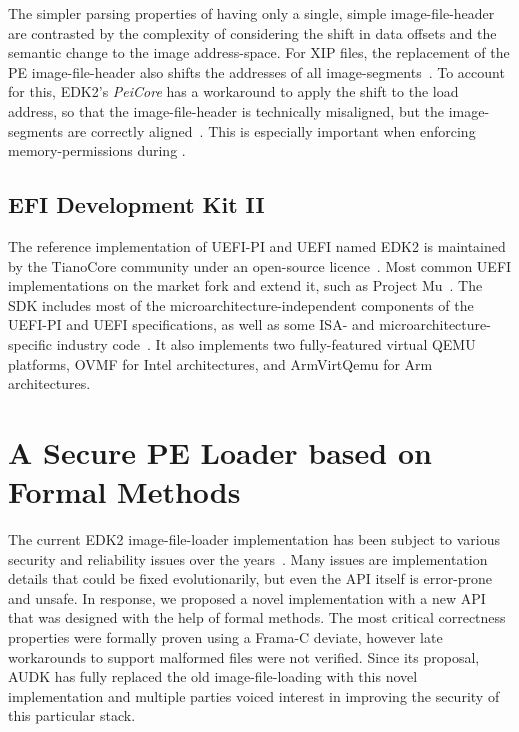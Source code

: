 The simpler parsing properties of having only a single, simple \gls{image-file-header} are contrasted by the complexity of considering the shift in data offsets and the semantic change to the \gls{image} \gls{address-space}. For \gls{XIP} files, the replacement of the \gls{PE} \gls{image-file-header} also shifts the addresses of all \glspl{image-segment}~\cite{secure-pe}. To account for this, \gls{EDK2}'s \textit{PeiCore} has a workaround to apply the shift to the load address, so that the \gls{image-file-header} is technically misaligned, but the \glspl{image-segment} are correctly aligned~\cite{edk2,secure-pe}. This is especially important when enforcing \glspl{memory-permission} during .

\subsection{EFI Development Kit II}

The reference implementation of \gls{UEFI-PI} and \gls{UEFI} named \gls{EDK2} is maintained by the TianoCore community under an open-source licence~\cite{edk2}. Most common \gls{UEFI} implementations on the market fork and extend it, such as  Project Mu~\cite{mu-basecore}. The \gls{SDK} includes most of the microarchitecture-independent components of the \gls{UEFI-PI} and \gls{UEFI} specifications, as well as some \gls{ISA}- and microarchitecture-specific industry code~\cite{edk2}. It also implements two fully-featured virtual QEMU~\cite{qemu} platforms, \gls{OVMF} for \gls{Intel} architectures, and \gls{ArmVirtQemu} for \gls{Arm} architectures.

\section{A Secure PE Loader based on Formal Methods}

The current \gls{EDK2}  \gls{image-file-loader} implementation has been subject to various security and reliability issues over the years~\cite{secure-pe}. Many issues are implementation details that could be fixed evolutionarily, but even the \gls{API} itself is error-prone and unsafe. In response, we proposed a novel implementation with a new \gls{API} that was designed with the help of formal methods. The most critical correctness properties were formally proven using a Frama-C deviate, however late workarounds to support malformed  files were not verified. Since its proposal, \gls{AUDK} has fully replaced the old \gls{image-file-loading} with this novel implementation and multiple parties voiced interest in improving the security of this particular stack.

